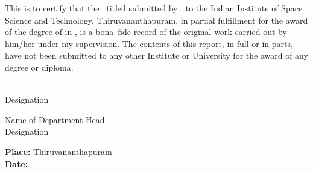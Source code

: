 This is to certify that the \Doctype\ titled \textbf{\textit{\Title}}
submitted by {\bf\Author}, to the Indian Institute of Space Science
and Technology, Thiruvananthapuram, in partial fulfillment for the
award of the degree of {\bf\Degreetext} in { \bf\Specialization}, is a
bona~fide record of the original work carried out by him/her under my
supervision. The contents of this report, in full or in parts, have
not been submitted to any other Institute or University for the award
of any degree or diploma.

\vspace{35mm}
\noindent
\begin{minipage}{0.5\textwidth}
\Advisor\\
Designation
\end{minipage}
\hspace{35mm}
\begin{minipage}{0.5\textwidth}
\raggedright{Name of Department Head}\\
Designation
\end{minipage}

\vspace{30mm}
\noindent
\textbf{Place: }Thiruvananthapuram\\
\textbf{Date: \ }\Date


